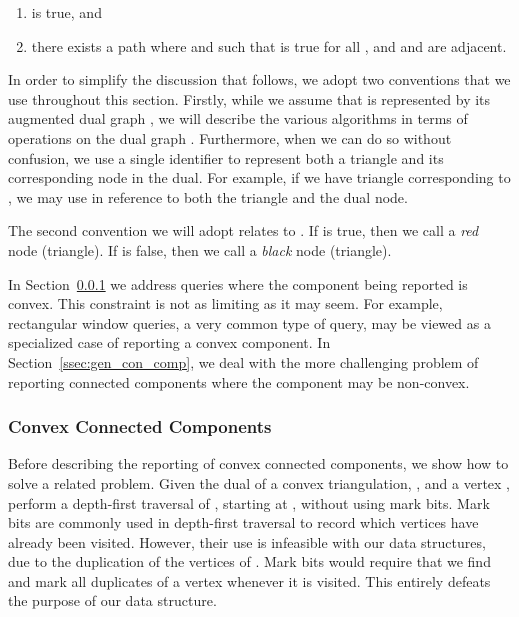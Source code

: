   \begin{enumerate}
    \item  is true, and
    \item there exists a path  where  and 
     such that  is true for all , and  
    and  are adjacent.
  \end{enumerate}

  In order to simplify the discussion that follows, we adopt two conventions that we use
  throughout this section. 
  Firstly, while we assume that  is represented by its augmented dual
  graph , we will describe the various algorithms in terms
  of operations on the dual graph . 
  Furthermore, when we can do so without confusion, we use a single identifier
  to represent both a triangle and its corresponding node in the dual.
  For example, if we have triangle  corresponding to  
  , we may use  in reference to both the
  triangle and the dual node.

  The second convention we will adopt relates to .
  If  is true, then we call  a \emph{red} node (triangle).  
  If  is false, then we call  a \emph{black} node (triangle).







  In Section~\ref{ssec:conv_con_comp} we address queries 
  where the component being reported is convex. 
  This constraint is not as limiting as it may seem.
  For example, rectangular window queries, a very common type of query, 
  may be viewed as a specialized case of reporting a convex 
  component.
  In Section~\ref{ssec:gen_con_comp}, we deal with the more challenging 
  problem of reporting
  connected components where the component may be non-convex.

\subsubsection{Convex Connected Components}\label{ssec:conv_con_comp}


  Before describing the reporting of convex connected components, we show how 
  to solve a related problem. 
  Given the dual of a convex triangulation, , and a 
  vertex , 
  perform a depth-first traversal of , starting at , without 
  using mark bits.
  Mark bits are commonly used in depth-first traversal to record which vertices 
  have already been visited. 
  However, their use is infeasible with our data structures, due to the 
  duplication of the vertices of .
  Mark bits would require that we find and mark all duplicates of 
  a vertex whenever it is visited.
  This entirely defeats the purpose of our data structure.

